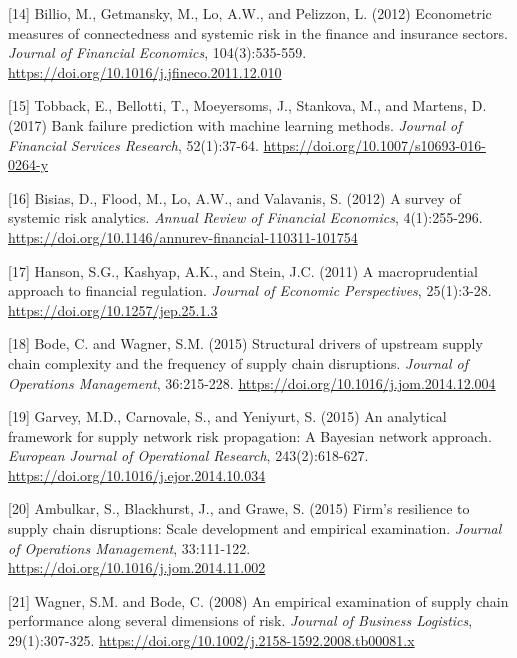 \documentclass[a4 paper, 11pt,twoside]{article}
\newcommand{\0}{\Bf{0}}
\theoremstyle{definition}
\begin{document}
\label{ref14}[14] Billio, M., Getmansky, M., Lo, A.W., and Pelizzon, L. (2012) Econometric measures of connectedness and systemic risk in the finance and insurance sectors. \emph{Journal of Financial Economics}, 104(3):535-559. \href{https://doi.org/10.1016/j.jfineco.2011.12.010}{https://doi.org/10.1016/j.jfineco.2011.12.010}

\label{ref15}[15] Tobback, E., Bellotti, T., Moeyersoms, J., Stankova, M., and Martens, D. (2017) Bank failure prediction with machine learning methods. \emph{Journal of Financial Services Research}, 52(1):37-64. \href{https://doi.org/10.1007/s10693-016-0264-y}{https://doi.org/10.1007/s10693-016-0264-y}

\label{ref16}[16] Bisias, D., Flood, M., Lo, A.W., and Valavanis, S. (2012) A survey of systemic risk analytics. \emph{Annual Review of Financial Economics}, 4(1):255-296. \href{https://doi.org/10.1146/annurev-financial-110311-101754}{https://doi.org/10.1146/annurev-financial-110311-101754}

\label{ref17}[17] Hanson, S.G., Kashyap, A.K., and Stein, J.C. (2011) A macroprudential approach to financial regulation. \emph{Journal of Economic Perspectives}, 25(1):3-28. \href{https://doi.org/10.1257/jep.25.1.3}{https://doi.org/10.1257/jep.25.1.3}

\label{ref18}[18] Bode, C. and Wagner, S.M. (2015) Structural drivers of upstream supply chain complexity and the frequency of supply chain disruptions. \emph{Journal of Operations Management}, 36:215-228. \href{https://doi.org/10.1016/j.jom.2014.12.004}{https://doi.org/10.1016/j.jom.2014.12.004}

\label{ref19}[19] Garvey, M.D., Carnovale, S., and Yeniyurt, S. (2015) An analytical framework for supply network risk propagation: A Bayesian network approach. \emph{European Journal of Operational Research}, 243(2):618-627. \href{https://doi.org/10.1016/j.ejor.2014.10.034}{https://doi.org/10.1016/j.ejor.2014.10.034}

\label{ref20}[20] Ambulkar, S., Blackhurst, J., and Grawe, S. (2015) Firm's resilience to supply chain disruptions: Scale development and empirical examination. \emph{Journal of Operations Management}, 33:111-122. \href{https://doi.org/10.1016/j.jom.2014.11.002}{https://doi.org/10.1016/j.jom.2014.11.002}

\label{ref21}[21] Wagner, S.M. and Bode, C. (2008) An empirical examination of supply chain performance along several dimensions of risk. \emph{Journal of Business Logistics}, 29(1):307-325. \href{https://doi.org/10.1002/j.2158-1592.2008.tb00081.x}{https://doi.org/10.1002/j.2158-1592.2008.tb00081.x}
\end{document}
